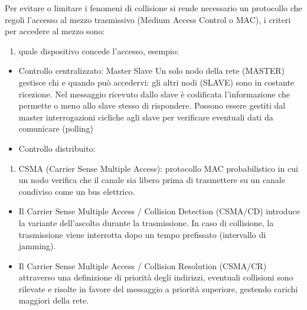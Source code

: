 \documentclass[
]{article}
\providecommand{\tightlist}{%
  \setlength{\itemsep}{0pt}\setlength{\parskip}{0pt}}
\begin{document}
{}

{Per evitare o limitare i fenomeni di collisione si rende necessario un
protocollo che regoli l'accesso al mezzo trasmissivo (Medium Access
Control o MAC), i criteri per accedere al mezzo sono:}

\begin{enumerate}
\tightlist
\item
  {quale dispositivo concede l'accesso, esempio:}
\end{enumerate}

\begin{itemize}
\tightlist
\item
  {Controllo centralizzato: Master Slave Un solo nodo della rete
  (MASTER) gestisce chi e quando può accedervi: gli altri nodi (SLAVE)
  sono in costante ricezione. Nel messaggio ricevuto dallo slave è
  codificata l'informazione che permette o meno allo slave stesso di
  rispondere. Possono essere gestiti dal master interrogazioni cicliche
  agli slave per verificare eventuali dati da comunicare (polling)}
\end{itemize}

{}

\begin{itemize}
\tightlist
\item
  {Controllo distribuito: }
\end{itemize}

\begin{enumerate}
\tightlist
\item
  {CSMA (Carrier Sense Multiple Access): protocollo MAC probabilistico
  in cui un nodo verifica che il canale sia libero prima di trasmettere
  su un canale condiviso come un bus elettrico. }
\end{enumerate}

\begin{itemize}
\tightlist
\item
  {Il Carrier Sense Multiple Access / Collision Detection (CSMA/CD)
  introduce la variante dell'ascolto durante la trasmissione. In caso di
  collisione, la trasmissione viene interrotta dopo un tempo prefissato
  (intervallo di jamming). }
\item
  {Il Carrier Sense Multiple Access / Collision Resolution (CSMA/CR)
  attraverso una definizione di priorità degli indirizzi, eventuali
  collisioni sono rilevate e risolte in favore del messaggio a priorità
  superiore, gestendo carichi maggiori della rete. }
\end{itemize}
\end{document}

